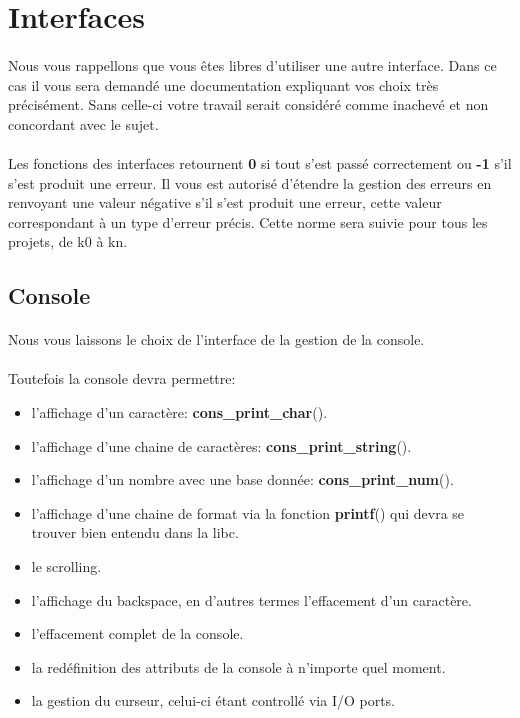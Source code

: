 \documentclass[10pt,a4wide]{article}
\begin{document}
\section{Interfaces}

\paragraph{}

Nous vous rappellons que vous \^etes libres d'utiliser une autre
interface. Dans ce cas il vous sera demand\'e une documentation expliquant
vos choix tr\`es pr\'ecis\'ement. Sans celle-ci votre travail serait
consid\'er\'e comme inachev\'e et non concordant avec le sujet.

\paragraph{}

Les fonctions des interfaces retournent \textbf{0} si tout s'est
pass\'e correctement ou \textbf{-1} s'il s'est produit une erreur.
Il vous est autoris\'e d'\'etendre la gestion des erreurs en
renvoyant une valeur n\'egative s'il s'est produit une erreur,
cette valeur correspondant \`a un type d'erreur pr\'ecis. Cette norme
sera suivie pour tous les projets, de k0 \`a kn.

\subsection{Console}

\paragraph{}

Nous vous laissons le choix de l'interface de la gestion de la console.

\paragraph{}

Toutefois la console devra permettre:

\begin{itemize}
\item l'affichage d'un caract\`ere: \textbf{cons\_print\_char}().
\item l'affichage d'une chaine de caract\`eres: \textbf{cons\_print\_string}().
\item l'affichage d'un nombre avec une base donn\'ee:
      \textbf{cons\_print\_num}().
\item l'affichage d'une chaine de format via la fonction \textbf{printf}() qui
      devra se trouver bien entendu dans la libc.
\item le scrolling.
\item l'affichage du backspace, en d'autres termes l'effacement
      d'un caract\`ere.
\item l'effacement complet de la console.
\item la red\'efinition des attributs de la console \`a n'importe quel moment.
\item la gestion du curseur, celui-ci \'etant controll\'e via I/O ports.
\end{itemize}
\end{document}
